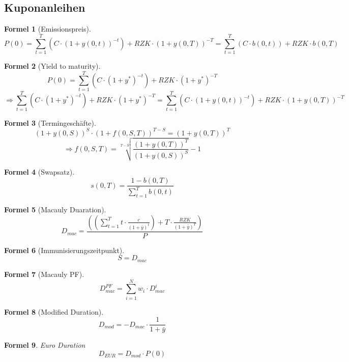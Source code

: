 \documentclass[a4paper]{article}
\theoremstyle{break}
\newtheorem{formula}{Formel}[section]
\newcommand{\st}{\sum_{t=1}^{T}}
\begin{document}
    \subsection{Kuponanleihen}
    \begin{formula}[Emissionspreis]
        $$P(0) = \st(C \cdot (1+y(0,t))^{-t})  + RZK \cdot (1 + y(0,T))^{-T} = \st(C \cdot b(0,t)) + RZK \cdot b(0,T)$$
    \end{formula}
    \begin{formula}[Yield to maturity]
        $$P(0) = \st(C \cdot (1 + y^{*})^{-t})  + RZK \cdot (1 + y^{*})^{-T}$$
        $$\Rightarrow \st(C \cdot (1 + y^{*})^{-t})  + RZK \cdot (1 + y^{*})^{-T} = \st(C \cdot (1+y(0,t))^{-t})  + RZK \cdot (1 + y(0,T))^{-T}$$
    \end{formula}
    \begin{formula}[Termingeschäfte]
        $$(1 + y(0,S))^S \cdot (1 + f(0,S,T))^{T-S} = (1 + y(0,T))^T$$
        $$\Rightarrow f(0,S,T) = \sqrt[T-S]{\frac{(1 + y(0,T))^T}{(1 + y(0,S))^S}} - 1$$
    \end{formula}
    \begin{formula}[Swapsatz]
        $$s(0,T) = \frac{1 - b(0,T)}{\sum_{t=1}^{T}b(0,t)}$$
    \end{formula}
    \begin{formula}[Macauly Duaration]
        $$D_{mac} = \frac{((\sum_{t=1}^{T} t \cdot \frac{c}{(1 + \bar{y})^t}) + T \cdot \frac{RZK}{(1 + \bar{y})^T})}{P}$$  
    \end{formula}
    \begin{formula}[Immunisierungszeitpunkt]
        $$ S = D_{mac}$$
    \end{formula}
    \begin{formula}[Macauly PF]
        $$ D_{mac}^{PF} = \sum_{i=1}^{N} w_i \cdot D_{mac}^{i} $$
    \end{formula}
    \begin{formula}[Modified Duration]
        $$ D_{mod} = - D_{mac} \cdot \frac{1}{1+\bar{y}} $$
    \end{formula}
    \begin{formula}{Euro Duration}
        $$ D_{EUR} = D_{mod} \cdot P(0) $$
    \end{formula}
\end{document}
